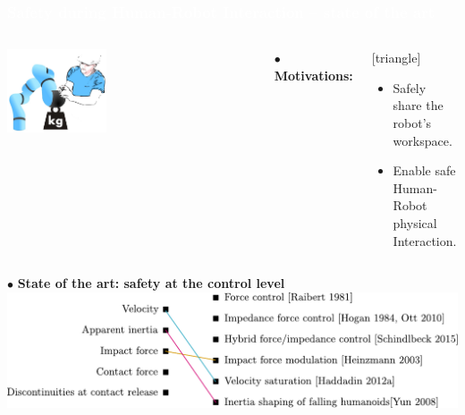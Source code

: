 \begin{frame}[noframenumbering]
  \frametitle{{\textcolor{white}{\hspace{0.3cm}Safety during Human-Robot Interaction -- state of the art}}}
  
 \vspace{-3mm} 
\begin{columns}
\column{.47\paperwidth}
\vspace{-5mm}
\begin{center}
\vspace{2mm}
\includegraphics[width=0.4\textwidth ]{figures/Human_robot_int.png}
\end{center}
 \vspace{-3mm} 
\column{.47\paperwidth}
$\bullet$ \textbf{Motivations:}                     
\begin{center}
[triangle]                        
\begin{itemize}
\item Safely share the robot's workspace.
\item Enable safe Human-Robot physical Interaction.
\end{itemize}                                            
\end{center}
\end{columns}

\vspace{7mm}
\hspace{-4mm}
$\bullet$ \textbf{State of the art: safety at the control level}
\vspace{6mm}
\includegraphics[width=1.0\textwidth]{figures/sttt3.pdf}
\vspace{-1mm}






\end{frame}




